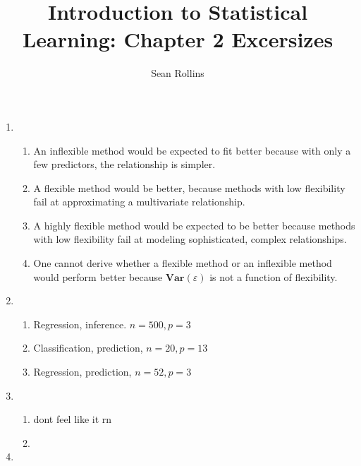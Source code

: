 \documentclass[11pt]{article}
\title{Introduction to Statistical Learning: Chapter 2 Excersizes}
\author{Sean Rollins}
\begin{document}
\maketitle


\begin{enumerate}

	\item{
	\begin{enumerate}
	
		\item{An inflexible method would be expected to fit better because with only a few predictors, the relationship is simpler.}
		\item{A flexible method would be better, because methods with low flexibility fail at approximating a multivariate relationship.}
		\item{A highly flexible method would be expected to be better because methods with low flexibility fail at modeling sophisticated, complex relationships.}
		\item{One cannot derive whether a flexible method or an inflexible method would perform better because $
		\mathbf{Var}(\varepsilon)$ is not a function of flexibility.}
	
	\end{enumerate}
	}
	
	\item{
		\begin{enumerate}
		
			\item{Regression, inference. $n = 500, p = 3$}
			\item{Classification, prediction, $n = 20, p = 13$}
			\item{Regression, prediction, $n = 52 , p = 3$}
		
		
		\end{enumerate}
	}
	
	\item{
	
		\begin{enumerate}
		
			\item{dont feel like it rn}
			\item{}
		
		\end{enumerate}
	
	}
	
	\item{
		\begin{enumerate}
		

\end{enumerate}}
\end{enumerate}
\end{document}
